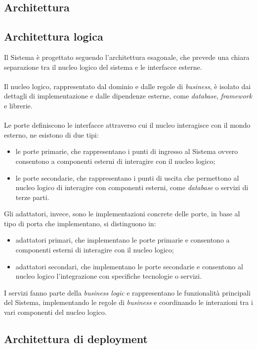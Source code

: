 \subsection{Architettura}

\subsection{Architettura logica}
Il Sistema è progettato seguendo l'architettura esagonale, che prevede una chiara separazione tra il nucleo logico del sistema 
e le interfacce esterne. \\ \\
Il nucleo logico, rappresentato dal dominio e dalle regole di \textit{business}, è isolato dai dettagli di 
implementazione e dalle dipendenze esterne, come \textit{database}, \textit{framework} e librerie. \\ \\
Le porte definiscono le interfacce attraverso cui il nucleo interagisce con il mondo esterno, ne esistono di due tipi: 
\begin{itemize}
    \item le porte primarie, che rappresentano i punti di ingresso al Sistema ovvero consentono a componenti esterni di 
    interagire con il nucleo logico;
    \item le porte secondarie, che rappresentano i punti di uscita che permettono al nucleo logico di interagire con componenti 
    esterni, come \textit{database} o servizi di terze parti.
\end{itemize}
Gli adattatori, invece, sono le implementazioni concrete delle porte, in base al tipo di porta che implementano, si distinguono in:
\begin{itemize}
    \item adattatori primari, che implementano le porte primarie e consentono a componenti esterni di interagire con il nucleo logico;
    \item adattatori secondari, che implementano le porte secondarie e consentono al nucleo logico l'integrazione con specifiche tecnologie 
    o servizi.
\end{itemize}
I servizi fanno parte della \textit{business logic} e rappresentano le funzionalità principali del Sistema, implementando le regole di \textit{business} 
e coordinando le interazioni tra i vari componenti del nucleo logico.

\subsection{Architettura di deployment}


